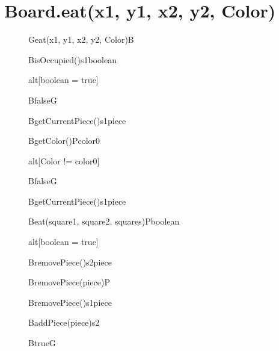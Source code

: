\documentclass[6pt,landscape]{article}
\begin{document}
\section{Board.eat(x1, y1, x2, y2, Color)}
\begin{figure}[H]
	\centering
  	\begin{adjustbox}{width=\textwidth, height=\textheight}
		\begin{sequencediagram}
			
			\begin{call}{G}{eat(x1, y1, x2, y2, Color)}{B}{}	
				\begin{call}{B}{isOccupied()}{s1}{boolean}
				\end{call}
				\begin{sdblock}{alt}{[boolean = true]}
					\begin{messcall}{B}{false}{G}
					\end{messcall} 					  		
				\end{sdblock}
				
				\begin{call}{B}{getCurrentPiece()}{s1}{piece}
				\end{call}
				\begin{call}{B}{getColor()}{P}{color0}
				\end{call}
				\begin{sdblock}{alt}{[Color != color0]}
					\begin{messcall}{B}{false}{G}
					\end{messcall} 					  		
				\end{sdblock}
				
				\begin{call}{B}{getCurrentPiece()}{s1}{piece}
				\end{call}
				\begin{call}{B}{eat(square1, square2, squares)}{P}{boolean}
				\end{call}
				\begin{sdblock}{alt}{[boolean = true]}
				    \begin{call}{B}{removePiece()}{s2}{piece}
				    \end{call}
				    \begin{messcall}{B}{removePiece(piece)}{P}{}
					\end{messcall}
					\begin{call}{B}{removePiece()}{s1}{piece}
					\end{call}
					\begin{messcall}{B}{addPiece(piece)}{s2}
					\end{messcall}
					\begin{messcall}{B}{true}{G}
					\end{messcall} 	
				\end{sdblock}
				

\end{call}
\end{sequencediagram}
\end{adjustbox}
\end{figure}
\end{document}
